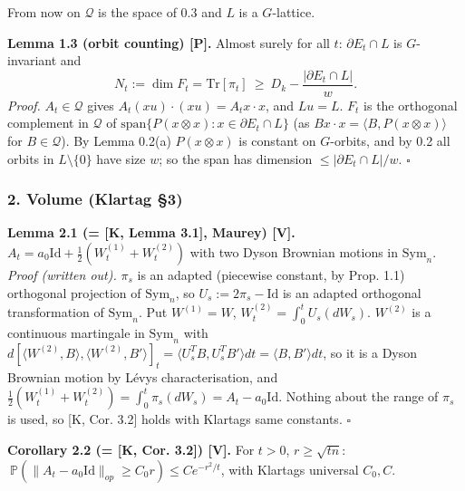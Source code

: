 From now on \(\mathcal Q\) is the space of 0.3 and \(L\) is a \(G\)-lattice.

\textbf{Lemma 1.3 (orbit counting) {[}P{]}.} Almost surely for all \(t\): \(\partial E_t\cap L\) is \(G\)-invariant and
\[N_t:=\dim F_t=\mathrm{Tr}[\pi_t]\ \ge\ D_k-\frac{|\partial E_t\cap L|}{w}.\]
\emph{Proof.} \(A_t\in\mathcal Q\) gives \(A_t(xu)\cdot(xu)=A_tx\cdot x\), and \(Lu=L\). \(F_t\) is the orthogonal complement in \(\mathcal Q\) of \(\mathrm{span}\{P(x\otimes x):x\in\partial E_t\cap L\}\)
(as \(Bx\cdot x=\langle B,P(x\otimes x)\rangle\) for \(B\in\mathcal Q\)). By Lemma 0.2(a) \(P(x\otimes x)\) is constant on \(G\)-orbits, and by 0.2 all orbits in \(L\setminus\{0\}\)
have size \(w\); so the span has dimension \(\le|\partial E_t\cap L|/w\). \(\square\)

\hypertarget{volume-klartag-3}{%
\subsubsection*{2. Volume (Klartag §3)}\label{volume-klartag-3}}

\textbf{Lemma 2.1 (= {[}K, Lemma 3.1{]}, Maurey) {[}V{]}.} \(A_t=a_0\mathrm{Id}+\frac12(W^{(1)}_t+W^{(2)}_t)\) with two Dyson Brownian motions in \(\mathrm{Sym}_n\).
\emph{Proof (written out).} \(\pi_s\) is an adapted (piecewise constant, by Prop. 1.1) orthogonal projection of \(\mathrm{Sym}_n\), so \(U_s:=2\pi_s-\mathrm{Id}\) is an adapted orthogonal transformation of \(\mathrm{Sym}_n\). Put \(W^{(1)}=W\), \(W^{(2)}_t=\int_0^tU_s(dW_s)\). \(W^{(2)}\) is a continuous martingale in \(\mathrm{Sym}_n\) with \(d[\langle W^{(2)},B\rangle,\langle W^{(2)},B'\rangle]_t=\langle U_s^TB,U_s^TB'\rangle dt=\langle B,B'\rangle dt\), so it is a Dyson Brownian motion by Lévy\textquotesingle s characterisation, and \(\frac12(W^{(1)}_t+W^{(2)}_t)=\int_0^t\pi_s(dW_s)=A_t-a_0\mathrm{Id}\). Nothing about the range of \(\pi_s\) is used, so {[}K, Cor. 3.2{]} holds with Klartag\textquotesingle s same constants. \(\square\)

\textbf{Corollary 2.2 (= {[}K, Cor. 3.2{]}) {[}V{]}.} For \(t>0\), \(r\ge\sqrt{tn}\): \(\ \mathbb P(\|A_t-a_0\mathrm{Id}\|_{op}\ge C_0r)\le Ce^{-r^2/t}\), with Klartag\textquotesingle s universal \(C_0,C\).

